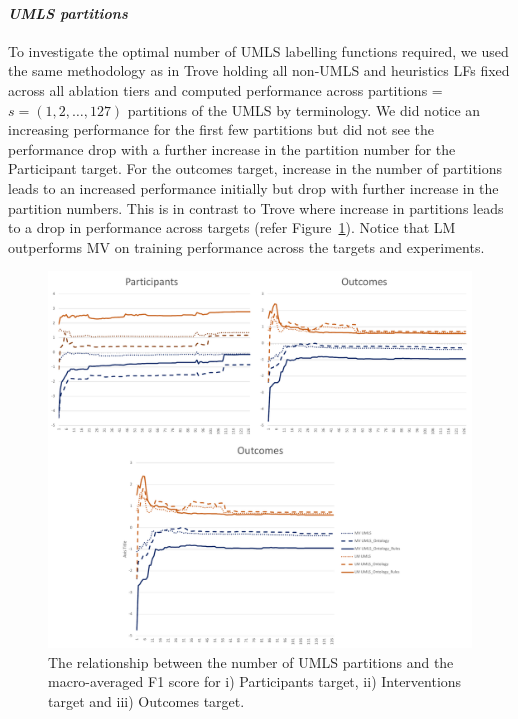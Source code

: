\documentclass[10.7pt,]{article}
\let\oldparagraph\paragraph
\renewcommand{\paragraph}[1]{\oldparagraph{#1}\mbox{}}
\begin{document}
\paragraph{\textit{UMLS partitions}}
To investigate the optimal number of UMLS labelling functions required, we used the same methodology as in Trove holding all non-UMLS and heuristics LFs fixed across all ablation tiers and computed performance across partitions = $s = ( 1, 2, \dotso , 127 )$ partitions of the UMLS by terminology.
We did notice an increasing performance for the first few partitions but did not see the performance drop with a further increase in the partition number for the Participant target.
For the outcomes target, increase in the number of partitions leads to an increased performance initially but drop with further increase in the partition numbers.
This is in contrast to Trove where increase in partitions leads to a drop in performance across targets (refer Figure~\ref{fig:partitions}).
Notice that LM outperforms MV on training performance across the targets and experiments.
%
\begin{figure}
    \centering
    \includegraphics{figures/partitions.pdf}
    \caption{The relationship between the number of UMLS partitions and the macro-averaged F1 score for i) Participants target, ii) Interventions target and iii) Outcomes target.}
    \label{fig:partitions}
\end{figure}
%
%
%
\end{document}
